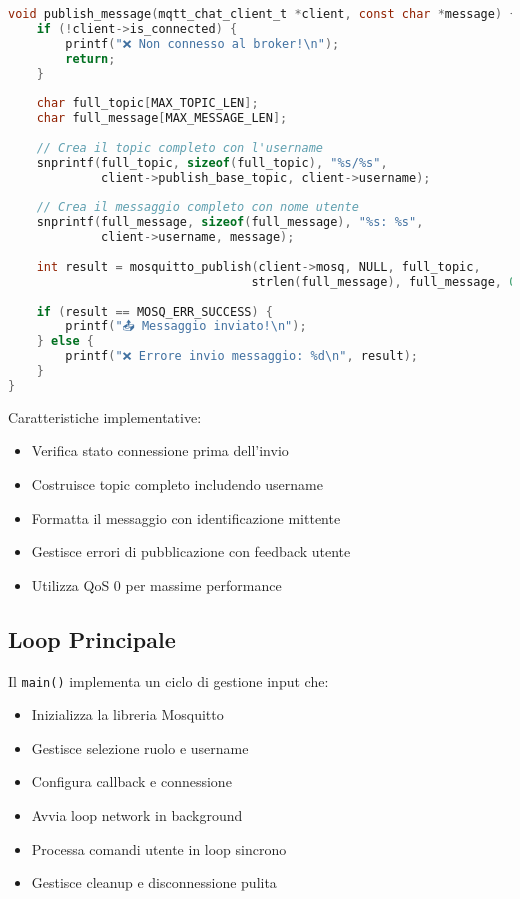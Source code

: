 \documentclass[12pt,a4paper]{article}
\begin{document}
\begin{lstlisting}[language=c, caption=Invio Messaggi]
void publish_message(mqtt_chat_client_t *client, const char *message) {
    if (!client->is_connected) {
        printf("❌ Non connesso al broker!\n");
        return;
    }
    
    char full_topic[MAX_TOPIC_LEN];
    char full_message[MAX_MESSAGE_LEN];
    
    // Crea il topic completo con l'username
    snprintf(full_topic, sizeof(full_topic), "%s/%s", 
             client->publish_base_topic, client->username);
    
    // Crea il messaggio completo con nome utente
    snprintf(full_message, sizeof(full_message), "%s: %s", 
             client->username, message);
    
    int result = mosquitto_publish(client->mosq, NULL, full_topic, 
                                  strlen(full_message), full_message, 0, false);
    
    if (result == MOSQ_ERR_SUCCESS) {
        printf("📤 Messaggio inviato!\n");
    } else {
        printf("❌ Errore invio messaggio: %d\n", result);
    }
}
\end{lstlisting}

Caratteristiche implementative:
\begin{itemize}
    \item Verifica stato connessione prima dell'invio
    \item Costruisce topic completo includendo username
    \item Formatta il messaggio con identificazione mittente
    \item Gestisce errori di pubblicazione con feedback utente
    \item Utilizza QoS 0 per massime performance
\end{itemize}

\subsection{Loop Principale}

Il \texttt{main()} implementa un ciclo di gestione input che:
\begin{itemize}
    \item Inizializza la libreria Mosquitto
    \item Gestisce selezione ruolo e username
    \item Configura callback e connessione
    \item Avvia loop network in background
    \item Processa comandi utente in loop sincrono
    \item Gestisce cleanup e disconnessione pulita
\end{itemize}
\end{document}
